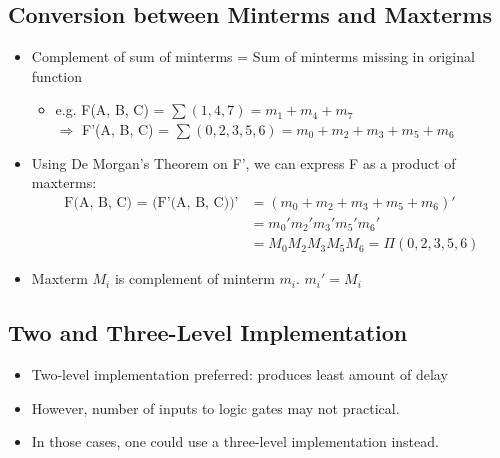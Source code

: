 \documentclass[a4paper]{article}
\begin{document}
\subsection{Conversion between Minterms and Maxterms}
\begin{itemize}
    \item Complement of sum of minterms = Sum of minterms missing in original function
    \begin{itemize}[label=$\circ$]
        \item e.g. F(A, B, C) = $\sum(1, 4, 7) = m_1+m_4+m_7$\\
        $\Rightarrow$ F'(A, B, C) = $\sum(0, 2, 3, 5, 6) = m_0+m_2+m_3+m_5+m_6$
    \end{itemize}
    \item Using De Morgan's Theorem on F', we can express F as a product of maxterms:
    \begin{align*}
        \text{F(A, B, C) = (F'(A, B, C))'} &= (m_0+m_2+m_3+m_5+m_6)'\\
        &= m_0'm_2'm_3'm_5'm_6'\\
        &= M_0M_2M_3M_5M_6 = \Pi(0, 2, 3, 5, 6)
    \end{align*}
    \item Maxterm $M_i$ is complement of minterm $m_i$. \qquad $m_i' = M_i$
\end{itemize}

\subsection{Two and Three-Level Implementation}
\begin{itemize}
    \item Two-level implementation preferred: produces least amount of delay
    \item However, number of inputs to logic gates may not practical.
    \item In those cases, one could use a three-level implementation instead.
\end{itemize}
\end{document}
